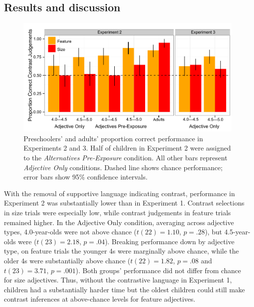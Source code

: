 \documentclass[man]{apa2}
\begin{document}
\subsection{Results and discussion}

\begin{figure}[t] 
  \begin{center} 
    \includegraphics[width=5.5in]{figures/experiments2and3.pdf} 
    \caption{\label{fig:expt2_kidsAdults} Preschoolers' and adults' proportion correct performance in Experiments 2 and 3. Half of children in Experiment 2 were assigned to the \emph{Alternatives Pre-Exposure} condition. All other bars represent \emph{Adjective Only} conditions. Dashed line shows chance performance; error bars show 95\% confidence intervals.}
  \end{center} 
  \vspace{-10ex} 
\end{figure}

With the removal of supportive language indicating contrast, performance in Experiment 2 was substantially lower than in Experiment 1. Contrast selections in size trials were especially low, while contrast judgements in feature trials remained higher. In the Adjective Only condition, averaging across adjective types, 4.0-year-olds were not above chance ($t(22) = 1.10$, $p = .28$), but 4.5-year-olds were ($t(23)=2.18$, $p = .04$). Breaking performance down by adjective type, on feature trials the younger 4s were marginally above chance, while the older 4s were substantially above chance ($t(22) = 1.82$, $p = .08$ and $t(23)=3.71$, $p = .001$). Both groups' performance did not differ from chance for size adjectives. Thus, without the contrastive language in Experiment 1, children had a substantially harder time but the oldest children could still make contrast inferences at above-chance levels for feature adjectives. 
\end{document}
